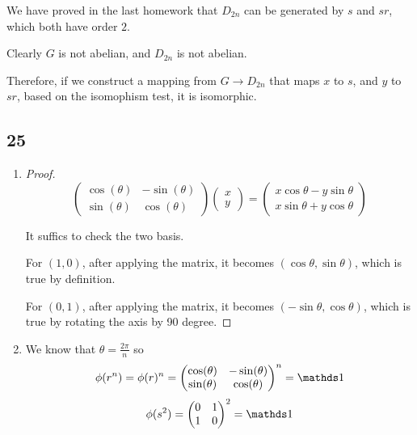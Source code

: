 We have proved in the last homework that $D_{2n}$ can be generated by
$s$ and $sr$, which both have order $2$.

Clearly $G$ is not abelian, and $D_{2n}$ is not abelian.

Therefore, if we construct a mapping from $G\to D_{2n}$ that maps $x$ to $s$,
and $y$ to $sr$, based on the isomophism test, it is isomorphic.



\subsection*{25}

\begin{enumerate}
	\item \begin{proof}
		      $$
			      \begin{pmatrix}
				      \cos (\theta) & -\sin(\theta) \\
				      \sin (\theta) & \cos(\theta)
			      \end{pmatrix}
			      \begin{pmatrix}
				      x \\
				      y
			      \end{pmatrix} =
			      \begin{pmatrix}
				      x \cos \theta - y \sin \theta \\
				      x \sin \theta + y \cos \theta
			      \end{pmatrix}
		      $$

		      It suffics to check the two basis.

		      For $(1,0)$, after applying the matrix,
		      it becomes $(\cos \theta, \sin \theta)$, which is true by definition.

		      For $(0,1)$, after applying the matrix,
		      it becomes $(-\sin \theta, \cos \theta)$, which is true by rotating the axis by 90 degree.

	      \end{proof}
	\item We know that $\theta=\frac{2\pi}{n}$ so
	      $$
		      \phi(r^n) = \phi(r)^n = \begin{pmatrix}
			      \cos (\theta) & -\sin(\theta) \\
			      \sin (\theta) & \cos(\theta)
		      \end{pmatrix}^n = \one
	      $$
	      $$
		      \phi(s^2) = \begin{pmatrix}
			      0 & 1 \\
			      1 & 0
		      \end{pmatrix}^2 = \one
	      $$


\end{enumerate}
